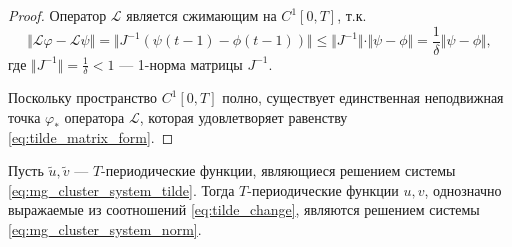 \begin{proof}
	Оператор $\mathcal{L}$ является сжимающим на $C^1[0, T]$, т.к.
	\[\Vert\mathcal{L}\varphi - \mathcal{L}\psi\Vert = \Vert J^{-1} (\psi(t - 1) - \phi(t - 1)) \Vert \leq \Vert J^{-1} \Vert \cdot \Vert \psi - \phi \Vert = \dfrac{1}{\delta} \Vert \psi - \phi \Vert,\]
	где $\Vert J^{-1} \Vert = \frac{1}{\delta} < 1$ --- 1-норма матрицы $J^{-1}$.
	
	Поскольку пространство $C^1[0, T]$ полно, существует единственная неподвижная точка $\varphi_*$ оператора $\mathcal{L}$, которая удовлетворяет равенству \eqref{eq:tilde_matrix_form}.
\end{proof}

\begin{lemma}
	\label{lm:uv_inverse_system}
	Пусть $\tilde{u}, \tilde{v}$ --- $T$-периодические функции, являющиеся решением системы \eqref{eq:mg_cluster_system_tilde}. Тогда $T$-периодические функции $u, v$, однозначно выражаемые из соотношений \eqref{eq:tilde_change}, являются решением системы \eqref{eq:mg_cluster_system_norm}.
\end{lemma}
